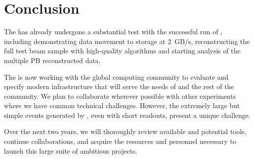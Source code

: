 \section{Conclusion}

The   has already undergone a substantial test with the successful run of , including demonstrating data movement to storage at \SI{2}{GB/s}, reconstructing the full test beam sample with high-quality algorithms and starting analysis of the multiple PB reconstructed data. 

The  is now working with the global  computing community to evaluate and specify modern infrastructure that will serve the needs of  and the rest of the community.  We plan to collaborate wherever possible with other experiments where we have common technical challenges. However, the extremely large but simple events generated by  , even with short readouts, present a unique challenge. 

Over the next two years, we  will thoroughly review available and potential tools, continue collaborations, and acquire the resources and personnel necessary to launch this large suite of ambitious projects. 
